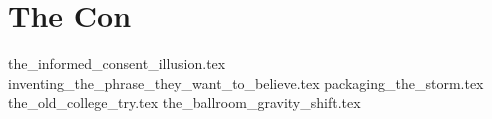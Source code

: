 \section{The Con}

{the_informed_consent_illusion.tex}
{inventing_the_phrase_they_want_to_believe.tex}
{packaging_the_storm.tex}
{the_old_college_try.tex}
{the_ballroom_gravity_shift.tex}